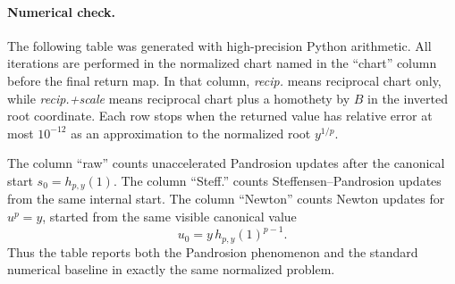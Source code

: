 \documentclass[10pt,a4paper]{article}
\theoremstyle{plain}
\theoremstyle{definition}
\theoremstyle{remark}
\begin{document}
\paragraph{Numerical check.}
The following table was generated with high-precision Python arithmetic.  All
iterations are performed in the normalized chart named in the ``chart'' column
before the final return map.  In that column, \emph{recip.} means reciprocal
chart only, while \emph{recip.+scale} means reciprocal chart plus a homothety
by $B$ in the inverted root coordinate.  Each row stops when the returned value
has relative error at most $10^{-12}$ as an approximation to the normalized
root $y^{1/p}$.

The column ``raw'' counts unaccelerated Pandrosion updates after the canonical
start $s_0=h_{p,y}(1)$.  The column ``Steff.'' counts
Steffensen--Pandrosion updates from the same internal start.  The column
``Newton'' counts Newton updates for $u^p=y$, started from the same visible
canonical value
\[
  u_0=y\,h_{p,y}(1)^{p-1}.
\]
Thus the table reports both the Pandrosion phenomenon and the standard
numerical baseline in exactly the same normalized problem.

\begin{center}
\scriptsize
{}
\end{center}
\end{document}
